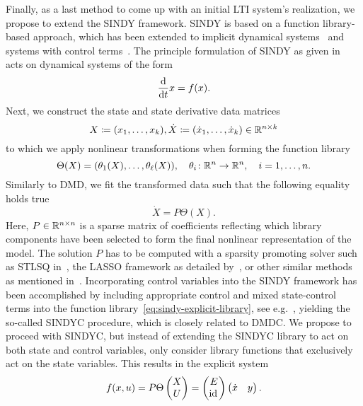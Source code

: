 Finally, as a last method to come up with an initial \ac{LTI} system's realization, we propose to extend the \ac{SINDY} framework.
\ac{SINDY} is based on a function library-based approach, which has been extended to implicit dynamical systems~\cite{Mangan2016, Kaheman2020} and systems with control terms~\cite{Kaiser2018}.
The principle formulation of \ac{SINDY} as given in~\cite{Brunton2016} acts on dynamical systems of the form
\begin{equation}\label{eq:sindy-explicit-dynamical-system}
    \frac{\mathop{}\!\mathrm{d}}{\mathop{}\!\mathrm{d} t} x = f(x).
\end{equation}
Next, we construct the state and state derivative data matrices
\begin{equation*}
	X \coloneqq (x_1, \dots, x_k), \dot{X} \coloneqq (\dot{x}_1, \dots, \dot{x}_k) \in \mathbb{R}^{n \times k}
\end{equation*}
to which we apply nonlinear transformations when forming the function library
\begin{equation}\label{eq:sindy-explicit-library}
    \Theta(X) = (\theta_1(X), \dots, \theta_\ell(X)),\quad \theta_i \colon \mathbb{R}^n \to \mathbb{R}^n,\quad i = 1, \dots, n.
\end{equation}
Similarly to \ac{DMD}, we fit the transformed data such that the following equality holds true
\begin{equation}\label{eq:sindy-explicit-fit}
    \dot{X} = P \Theta(X).
\end{equation}
Here, $P \in \mathbb{R}^{n \times n}$ is a sparse matrix of coefficients reflecting which library components have been selected to form the final nonlinear representation of the model.
The solution $P$ has to be computed with a sparsity promoting solver such as \ac{STLSQ} in~\cite{Zhang2019}, the LASSO framework as detailed by~\cite{Tibshirani1996}, or other similar methods as mentioned in~\cite{Kaiser2018, Kaheman2020}.
Incorporating control variables into the \ac{SINDY} framework has been accomplished by including appropriate control and mixed state-control terms into the function library~\eqref{eq:sindy-explicit-library}, see e.g.~\cite{Kaiser2018}, yielding the so-called \ac{SINDYC} procedure, which is closely related to \ac{DMDC}.
We propose to proceed with \ac{SINDYC}, but instead of extending the \ac{SINDYC} library to act on both state and control variables, only consider library functions that exclusively act on the state variables.
This results in the explicit system
\begin{equation}\label{eq:sindy-io}
    f(x, u) = P \Theta \begin{pmatrix}
        X \\
        U
    \end{pmatrix} = \begin{pmatrix}
        E \\
        \text{id}_{\mkern2mu }
    \end{pmatrix} \begin{pmatrix}
        \dot{x} & y
    \end{pmatrix}.
\end{equation}
